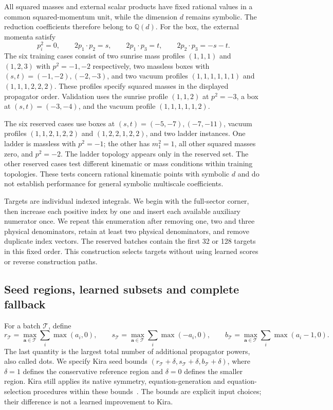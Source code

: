 All squared masses and external scalar products have fixed rational
values in a common squared-momentum unit, while the dimension $d$
remains symbolic. The reduction coefficients therefore belong to
$\mathbb Q(d)$. For the box, the external momenta satisfy
\[
 p_i^2=0,\qquad
 2p_1\cdot p_2=s,\qquad
 2p_1\cdot p_3=t,\qquad
 2p_2\cdot p_3=-s-t.
\]
The six training cases consist of two sunrise mass profiles
$(1,1,1)$ and $(1,2,3)$ with $p^2=-1,-2$ respectively, two massless
boxes with $(s,t)=(-1,-2),(-2,-3)$, and two vacuum profiles
$(1,1,1,1,1,1)$ and $(1,1,1,2,2,2)$. These profiles specify squared
masses in the displayed propagator order. Validation uses the sunrise
profile $(1,1,2)$ at $p^2=-3$, a box at $(s,t)=(-3,-4)$, and the vacuum
profile $(1,1,1,1,1,2)$.

The six reserved cases use boxes at $(s,t)=(-5,-7),(-7,-11)$,
vacuum profiles $(1,1,2,1,2,2)$ and $(1,2,2,1,2,2)$, and two ladder
instances. One ladder is massless with $p^2=-1$; the other has
$m_1^2=1$, all other squared masses zero, and $p^2=-2$. The ladder
topology appears only in the reserved set. The other reserved cases
test different kinematic or mass conditions within training topologies.
These tests concern rational kinematic points with symbolic $d$ and
do not establish performance for general symbolic multiscale
coefficients.

Targets are individual indexed integrals. We begin with the full-sector
corner, then increase each positive index by one and insert each
available auxiliary numerator once. We repeat this enumeration after
removing one, two and three physical denominators, retain at least two
physical denominators, and remove duplicate index vectors. The reserved
batches contain the first 32 or 128 targets in this fixed order. This
construction selects targets without using learned scores or reverse
construction paths.

\subsection{Seed regions, learned subsets and complete fallback}
For a batch $\mathcal T$, define
\[
 r_{\mathcal T}=\max_{\boldsymbol a\in\mathcal T}
                  \sum_i\max(a_i,0),\qquad
 s_{\mathcal T}=\max_{\boldsymbol a\in\mathcal T}
                  \sum_i\max(-a_i,0),\qquad
 b_{\mathcal T}=\max_{\boldsymbol a\in\mathcal T}
                  \sum_i\max(a_i-1,0).
\]
The last quantity is the largest total number of additional propagator
powers, also called dots. We specify Kira seed bounds
$(r_{\mathcal T}+\delta,s_{\mathcal T}+\delta,b_{\mathcal T}+\delta)$,
where $\delta=1$ defines the conservative reference region and
$\delta=0$ defines the smaller region. Kira still applies its native
symmetry, equation-generation and equation-selection procedures within
these bounds~\cite{Kira3}. The bounds are explicit input choices;
their difference is not a learned improvement to Kira.


